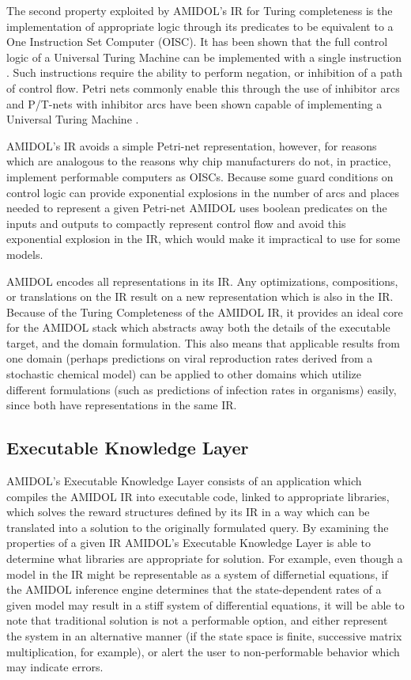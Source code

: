 \documentclass[11pt]{article}
\newcommand{\amidol}{\textsc{AMIDOL}}
\begin{document}
The second property exploited by \amidol{}'s IR for Turing
completeness is the implementation of appropriate logic through its
predicates to be equivalent to a One Instruction Set Computer (OISC).
It has been shown that the full control logic of a Universal Turing
Machine can be implemented with a single instruction
\cite{mavaddat1988urisc}.  Such instructions require the ability to
perform negation, or inhibition of a path of control flow.  Petri nets
commonly enable this through the use of inhibitor arcs
\cite{ciardo1994petri} and P/T-nets with inhibitor arcs have been
shown capable of implementing a Universal Turing Machine
\cite{hack1976petri}.

\amidol{}'s IR avoids a simple Petri-net representation, however, for
reasons which are analogous to the reasons why chip manufacturers do
not, in practice, implement performable computers as OISCs.  Because
some guard conditions on control logic can provide exponential
explosions in the number of arcs and places needed to represent a
given Petri-net \cite{sanders1991reduced} \amidol{} uses boolean
predicates on the inputs and outputs to compactly represent control
flow and avoid this exponential explosion in the IR, which would make
it impractical to use for some models.

\amidol{} encodes all representations in its IR.  Any optimizations,
compositions, or translations on the IR result on a new representation
which is also in the IR.  Because of the Turing Completeness of the
\amidol{} IR, it provides an ideal core for the \amidol{} stack which
abstracts away both the details of the executable target, and the
domain formulation.  This also means that applicable results from
one domain (perhaps predictions on viral reproduction rates
derived from a stochastic chemical model) can be applied to other
domains which utilize different formulations (such as predictions of
infection rates in organisms) easily, since both have representations
in the same IR.

\subsection{Executable Knowledge Layer}

\amidol{}'s Executable Knowledge Layer consists of an application
which compiles the \amidol{} IR into executable code, linked to
appropriate libraries, which solves the reward structures defined by
its IR in a way which can be translated into a solution to the
originally formulated query.  By examining the properties of a given
IR \amidol{}'s Executable Knowledge Layer is able to determine what
libraries are appropriate for solution.  For example, even though a
model in the IR might be representable as a system of differnetial
equations, if the \amidol{} inference engine determines that the
state-dependent rates of a given model may result in a stiff system of
differential equations, it will be able to note that traditional
solution is not a performable option, and either represent the system in an
alternative manner (if the state space is finite, successive matrix
multiplication, for example), or alert the user to non-performable
behavior which may indicate errors.
\end{document}
